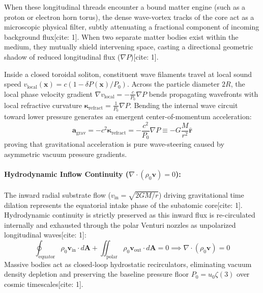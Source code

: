 \documentclass[11pt,a4paper]{article}
\begin{document}
	When these longitudinal threads encounter a bound matter engine (such as a proton or electron horn torus), the dense wave-vortex tracks of the core act as a microscopic physical filter, subtly attenuating a fractional component of incoming background flux[cite: 1]. When two separate matter bodies exist within the medium, they mutually shield intervening space, casting a directional geometric shadow of reduced longitudinal flux ($\nabla P$)[cite: 1].
	
	Inside a closed toroidal soliton, constituent wave filaments travel at local sound speed $v_{\text{local}}(\mathbf{x}) = c (1 - \delta P(\mathbf{x})/P_0)$. Across the particle diameter $2R$, the local phase velocity gradient $\nabla v_{\text{local}} = -\frac{c}{P_0}\nabla P$ bends propagating wavefronts with local refractive curvature $\boldsymbol{\kappa}_{\text{refract}} = \frac{1}{P_0}\nabla P$. Bending the internal wave circuit toward lower pressure generates an emergent center-of-momentum acceleration:
	\begin{equation}
		\mathbf{a}_{\text{grav}} = -c^2 \boldsymbol{\kappa}_{\text{refract}} = -\frac{c^2}{P_0} \nabla P \equiv -G \frac{M}{r^2} \hat{\mathbf{r}}
	\end{equation}
	proving that gravitational acceleration is pure wave-steering caused by asymmetric vacuum pressure gradients.
	
	\paragraph{Hydrodynamic Inflow Continuity ($\nabla \cdot (\rho_0 \mathbf{v}) = 0$):}
	The inward radial substrate flow ($v_{\text{in}} = \sqrt{2GM/r}$) driving gravitational time dilation represents the equatorial intake phase of the subatomic core[cite: 1]. Hydrodynamic continuity is strictly preserved as this inward flux is re-circulated internally and exhausted through the polar Venturi nozzles as unpolarized longitudinal waves[cite: 1]:
	\begin{equation}
		\oint_{\text{equator}} \rho_0 \mathbf{v}_{\text{in}} \cdot d\mathbf{A} + \iint_{\text{polar}} \rho_0 \mathbf{v}_{\text{out}} \cdot d\mathbf{A} = 0 \implies \nabla \cdot (\rho_0 \mathbf{v}) = 0
	\end{equation}
	Massive bodies act as closed-loop hydrostatic recirculators, eliminating vacuum density depletion and preserving the baseline pressure floor $P_0 = u_0 \zeta(3)$ over cosmic timescales[cite: 1].
	
\end{document}
